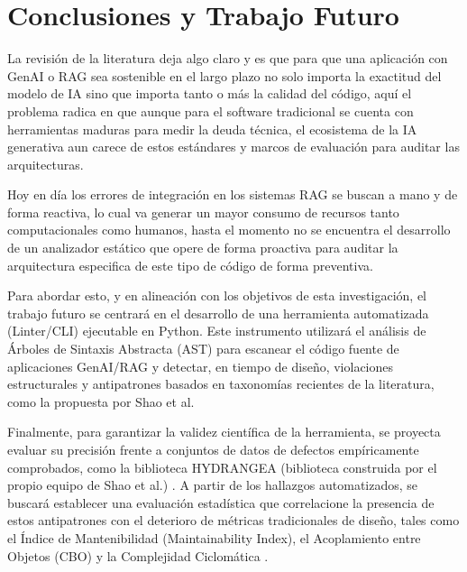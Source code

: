 \section{Conclusiones y Trabajo Futuro}

La revisión de la literatura  deja algo claro y es que para que una aplicación con GenAI o RAG sea sostenible en el largo plazo no solo importa la exactitud del modelo de IA sino que importa tanto o más la calidad del código, aquí el problema radica en que aunque para el software tradicional se cuenta con herramientas maduras para medir la deuda técnica, el ecosistema de la IA generativa aun carece de estos estándares y marcos de evaluación para auditar las arquitecturas.

Hoy en día los errores de integración en los sistemas RAG se buscan a mano y de forma reactiva, lo cual va generar un mayor consumo de recursos tanto computacionales como humanos, hasta el momento no se encuentra el desarrollo de un analizador estático que opere de forma proactiva para auditar la arquitectura especifica de este tipo de código de forma preventiva.

Para abordar esto, y en alineación con los objetivos de esta investigación, el trabajo futuro se centrará en el desarrollo de una herramienta automatizada (Linter/CLI) ejecutable en Python. Este instrumento utilizará el análisis de Árboles de Sintaxis Abstracta (AST) para escanear el código fuente de aplicaciones GenAI/RAG y detectar, en tiempo de diseño, violaciones estructurales y antipatrones basados en taxonomías recientes de la literatura, como la propuesta por Shao et al. \cite{shao_are_2024}

Finalmente, para garantizar la validez científica de la herramienta, se proyecta evaluar su precisión frente a conjuntos de datos de defectos empíricamente comprobados, como la biblioteca HYDRANGEA (biblioteca construida por el propio equipo de Shao et al.) \cite{shao_are_2024}. A partir de los hallazgos automatizados, se buscará establecer una evaluación estadística que correlacione la presencia de estos antipatrones con el deterioro de métricas tradicionales de diseño, tales como el Índice de Mantenibilidad (Maintainability Index), el Acoplamiento entre Objetos (CBO) y la Complejidad Ciclomática \cite{chidamber_metrics_1994}.